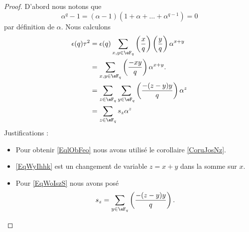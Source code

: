 \begin{proof}
    D'abord nous notons que
    \begin{equation}
        \alpha^q-1=(\alpha-1)(1+\alpha+\ldots+\alpha^{q-1})=0
    \end{equation}
    par définition de \( \alpha\). Nous calculons
    \begin{subequations}
        \begin{align}
            \epsilon(q)\tau^2&=\epsilon(q)\sum_{x,y\in \eF_q}\left(\frac{x}{q}\right)\left(\frac{y}{q}\right)\alpha^{x+y}\\
            &=\sum_{x,y\in \eF_q}\left(\frac{-xy}{q}\right)\alpha^{x+y}. \label{EqlObFeo}\\
            &=\sum_{z\in \eF_q}\sum_{y\in \eF_q}\left(\frac{-(z-y)y}{q}\right)\alpha^{z}    \label{EqWyIhhk}\\
            &=\sum_{z\in \eF_q}s_z\alpha^z  \label{EqWoIszS}
        \end{align}
    \end{subequations}
    Justifications :
    \begin{itemize}
        \item 
            Pour obtenir \eqref{EqlObFeo} nous avons utilisé le corollaire \ref{CoruJosNz}. 
        \item
            \eqref{EqWyIhhk} est un changement de variable \( z=x+y\) dans la somme sur \( x\).
        \item
            Pour \eqref{EqWoIszS} nous avons posé
            \begin{equation}
                s_z=\sum_{y\in \eF_q}\left(\frac{-(z-y)y}{q}\right).
            \end{equation}
            

\end{itemize}
\end{proof}
